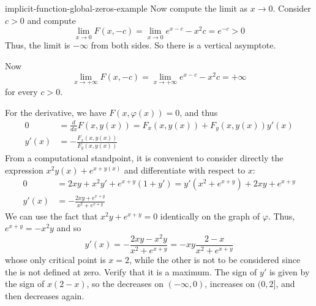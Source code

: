 \documentclass[preview]{standalone}
\begin{document}
\begin{snippetexample}{implicit-function-global-zeros-example}{}
    Now compute the limit as \(x \to 0\).
    Consider \(c > 0\) and compute
    \[
        \lim_{x \to 0} F(x, -c) = \lim_{x \to 0} e^{x-c} - x^2 c = e^{-c} > 0
    \]
    Thus, the limit is \(-\infty\) from both sides.
    So there is a vertical asymptote.
    
    Now
    \[
        \lim_{x \to +\infty} F(x, -c) = \lim_{x \to +\infty} e^{x-c} - x^2 c = +\infty
    \]
    for every \(c > 0\).
    
    For the derivative, we have \(F(x, \varphi(x)) = 0\),
    and thus
    \begin{align*}
        0 &= \frac{d}{dx} F(x, y(x)) = F_x(x, y(x)) + F_y(x, y(x)) y'(x) \\
        y'(x) &= -\frac{F_x(x, y(x))}{F_y(x, y(x))}
    \end{align*}
    From a computational standpoint, it is convenient to consider directly the expression
    \(x^2 y(x) + e^{x + y(x)}\) and differentiate with respect to \(x\):
    \begin{align*}
        0 &= 2xy + x^2 y' + e^{x+y}(1 + y') = y'(x^2 + e^{x+y}) + 2xy + e^{x+y} \\
        y'(x) &= -\frac{2xy + e^{x+y}}{x^2 + e^{x+y}}
    \end{align*}
    We can use the fact that \(x^2 y + e^{x+y} = 0\) identically on the graph of \(\varphi\).
    Thus, \(e^{x+y} = -x^2 y\) and so
    \[
        y'(x) = -\frac{2xy - x^2 y}{x^2 + e^{x+y}} = -xy \frac{2-x}{x^2 + e^{x+y}}
    \]
    whose only critical point is \(x = 2\), while the other is not
    to be considered since the \function is not defined at zero.
    Verify that it is a maximum.
    The sign of \(y'\) is given by the sign of \(x(2-x)\),
    so the \function decreases on \((-\infty, 0)\),
    increases on \((0, 2]\), and then decreases again.
    

\end{snippetexample}
\end{document}
